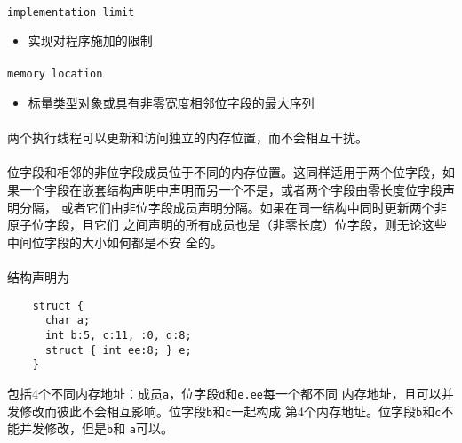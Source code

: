 \paragraph{}
\texttt{implementation limit}
\begin{itemize}
  \item[]{实现对程序施加的限制}
\end{itemize}

\paragraph{}
\texttt{memory location}
\begin{itemize}
  \item[]{标量类型对象或具有非零宽度相邻位字段的最大序列}
\end{itemize}

\paragraph{}
\notes 两个执行线程可以更新和访问独立的内存位置，而不会相互干扰。

\paragraph{}
\notes 位字段和相邻的非位字段成员位于不同的内存位置。这同样适用于两个位字段，如
果一个字段在嵌套结构声明中声明而另一个不是，或者两个字段由零长度位字段声明分隔，
或者它们由非位字段成员声明分隔。如果在同一结构中同时更新两个非原子位字段，且它们
之间声明的所有成员也是（非零长度）位字段，则无论这些中间位字段的大小如何都是不安
全的。

\paragraph{}
\ex* 结构声明为
\begin{lstlisting}
    struct {
      char a;
      int b:5, c:11, :0, d:8;
      struct { int ee:8; } e;
    }
\end{lstlisting}
包括4个不同内存地址：成员\texttt{a}，位字段\texttt{d}和\texttt{e.ee}每一个都不同
内存地址，且可以并发修改而彼此不会相互影响。位字段\texttt{b}和\texttt{c}一起构成
第4个内存地址。位字段\texttt{b}和\texttt{c}不能并发修改，但是\texttt{b}和
\texttt{a}可以。


